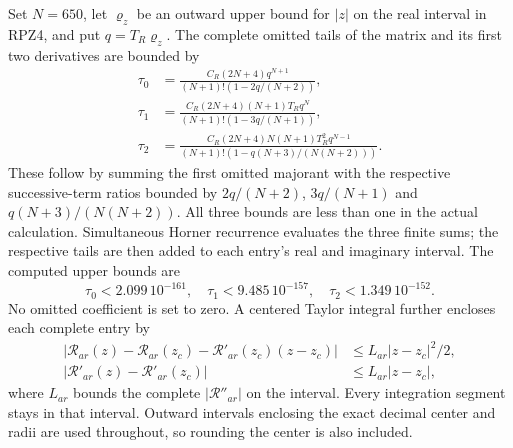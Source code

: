 Set $N=650$, let $\varrho_z$ be an outward upper bound for $|z|$ on the
real interval in RPZ4, and put $q=T_R\varrho_z$. The complete omitted
tails of the matrix and its first two derivatives are bounded by
\[
 \begin{aligned}
 \tau_0&=\frac{C_R(2N+4)q^{N+1}}{(N+1)!(1-2q/(N+2))},\\
 \tau_1&=\frac{C_R(2N+4)(N+1)T_Rq^N}{(N+1)!(1-3q/(N+1))},\\
 \tau_2&=\frac{C_R(2N+4)N(N+1)T_R^2q^{N-1}}
 {(N+1)!(1-q(N+3)/(N(N+2)))} .
 \end{aligned}\tag{RPZ6}
\]
These follow by summing the first omitted majorant with the
respective successive-term ratios bounded by
$2q/(N+2)$, $3q/(N+1)$ and $q(N+3)/(N(N+2))$.
All three bounds are less than one in the actual calculation.
Simultaneous Horner recurrence evaluates the three finite sums;
the respective tails are then added to each entry's real and
imaginary interval. The computed upper bounds are
\[
 \tau_0<2.099\,10^{-161},\quad
 \tau_1<9.485\,10^{-157},\quad
 \tau_2<1.349\,10^{-152}.\tag{RPZ7}
\]
No omitted coefficient is set to zero. A centered Taylor integral
further encloses each complete entry by
\[
 \begin{aligned}
 |\mathcal R_{ar}(z)-\mathcal R_{ar}(z_c)
              -\mathcal R'_{ar}(z_c)(z-z_c)|&\le L_{ar}|z-z_c|^2/2,\\
 |\mathcal R'_{ar}(z)-\mathcal R'_{ar}(z_c)|&\le L_{ar}|z-z_c|,
 \end{aligned}\tag{RPZ8}
\]
where $L_{ar}$ bounds the complete $|\mathcal R''_{ar}|$ on the
interval. Every integration segment stays in that interval.
Outward intervals enclosing the exact decimal center and radii
are used throughout, so rounding the center is also included.

